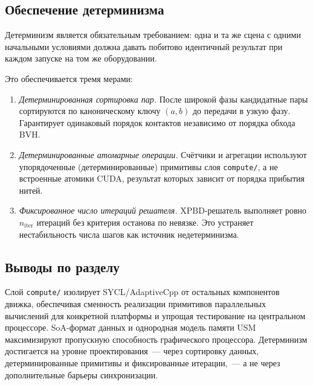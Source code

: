 \subsection{Обеспечение детерминизма}

Детерминизм является обязательным требованием: одна и та же сцена с одними начальными условиями должна давать 
побитово идентичный результат при каждом запуске на том же оборудовании.

Это обеспечивается тремя мерами:

\begin{enumerate}
  \item \textit{Детерминированная сортировка пар.}
    После широкой фазы кандидатные пары сортируются по каноническому ключу $(a, b)$
    до передачи в узкую фазу.
    Гарантирует одинаковый порядок контактов независимо от порядка обхода BVH.
  \item \textit{Детерминированные атомарные операции.}
    Счётчики и агрегации используют упорядоченные (детерминированные) примитивы
    слоя \texttt{compute/}, а не встроенные атомики CUDA, результат которых
    зависит от порядка прибытия нитей.
  \item \textit{Фиксированное число итераций решателя.}
    XPBD-решатель выполняет ровно $n_{\text{iter}}$ итераций
    без критерия останова по невязке.
    Это устраняет нестабильность числа шагов как источник недетерминизма.
\end{enumerate}

\subsection{Выводы по разделу}

Слой \texttt{compute/} изолирует SYCL/AdaptiveCpp от остальных компонентов движка, обеспечивая сменность 
реализации примитивов параллельных вычислений для конкретной платформы и упрощая тестирование на центральном 
процессоре. SoA-формат данных и однородная модель памяти USM максимизируют пропускную способность графического 
процессора. Детерминизм достигается на уровне проектирования~--- через сортировку данных, детерминированные 
примитивы и фиксированные итерации,~--- а не через дополнительные барьеры синхронизации.
